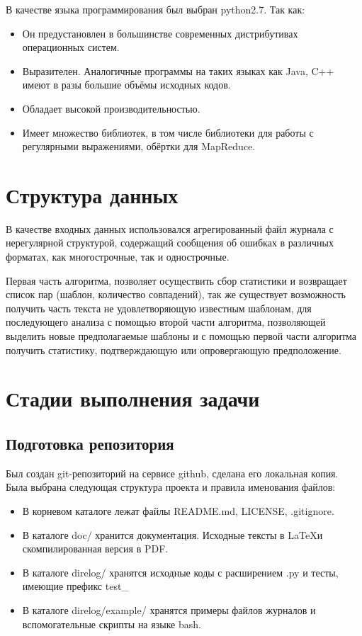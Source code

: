 В качестве языка программирования был выбран python2.7. Так как:

\begin{itemize}
\item Он предустановлен в большинстве современных дистрибутивах
  операционных систем.
\item Выразителен. Аналогичные программы на таких языках как Java, C++
  имеют в разы большие объёмы исходных кодов.
\item Обладает высокой производительностью.
\item Имеет множество библиотек, в том числе библиотеки для работы с
  регулярными выражениями, обёртки для MapReduce.

\end{itemize}

\section{Структура данных}
В качестве входных данных использовался агрегированный файл журнала с
нерегулярной структурой, содержащий сообщения об ошибках в различных форматах,
как многострочные, так и однострочные.

Первая часть алгоритма, позволяет осуществить сбор статистики
и возвращает список пар (шаблон, количество совпадений), так же существует
возможность получить часть текста не удовлетворяющую известным шаблонам,
для последующего анализа с помощью второй части алгоритма, позволяющей
выделить новые предполагаемые шаблоны и с помощью первой части алгоритма
получить статистику, подтверждающую или опровергающую предположение.

\section{Стадии выполнения задачи}
\subsection{Подготовка репозитория}
Был создан git-репозиторий на сервисе github, сделана его локальная копия.
Была выбрана следующая структура проекта и правила именования файлов:

\begin{itemize}
\item В корневом каталоге лежат файлы README.md, LICENSE, .gitignore.
\item В каталоге doc/ хранится документация. Исходные тексты в \LaTeX и
  скомпилированная версия в PDF.
\item В каталоге direlog/ хранятся исходные коды с расширением .py и тесты,
  имеющие префикс test\_
\item В каталоге direlog/example/ хранятся примеры файлов журналов и
  вспомогательные скрипты на языке bash.
\end{itemize}

